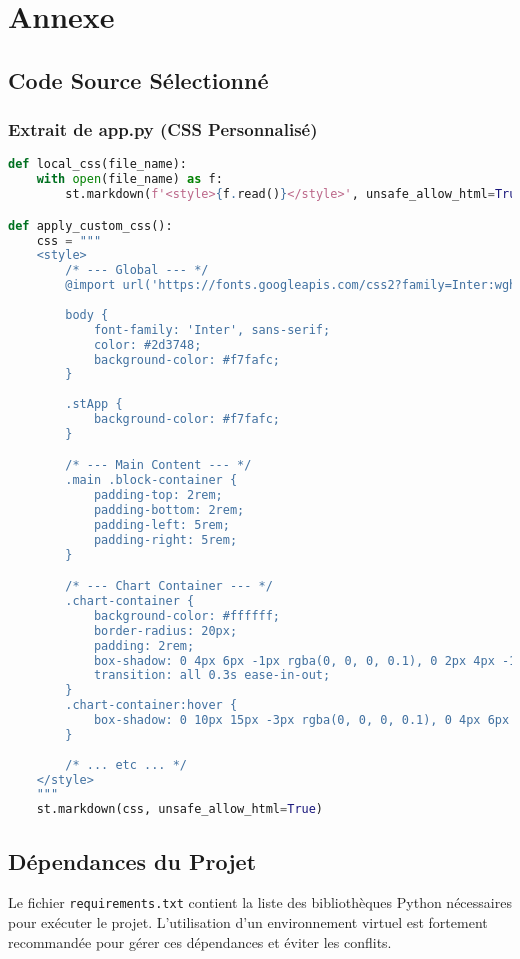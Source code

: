 \chapter{Annexe}
\minitoc

\section{Code Source Sélectionné}

\subsection{Extrait de app.py (CSS Personnalisé)}
\begin{lstlisting}[language=Python, caption={CSS pour le style du tableau de bord}]
def local_css(file_name):
    with open(file_name) as f:
        st.markdown(f'<style>{f.read()}</style>', unsafe_allow_html=True)

def apply_custom_css():
    css = """
    <style>
        /* --- Global --- */
        @import url('https://fonts.googleapis.com/css2?family=Inter:wght@400;600;700&display=swap');
        
        body {
            font-family: 'Inter', sans-serif;
            color: #2d3748;
            background-color: #f7fafc;
        }
        
        .stApp {
            background-color: #f7fafc;
        }

        /* --- Main Content --- */
        .main .block-container {
            padding-top: 2rem;
            padding-bottom: 2rem;
            padding-left: 5rem;
            padding-right: 5rem;
        }

        /* --- Chart Container --- */
        .chart-container {
            background-color: #ffffff;
            border-radius: 20px;
            padding: 2rem;
            box-shadow: 0 4px 6px -1px rgba(0, 0, 0, 0.1), 0 2px 4px -1px rgba(0, 0, 0, 0.06);
            transition: all 0.3s ease-in-out;
        }
        .chart-container:hover {
            box-shadow: 0 10px 15px -3px rgba(0, 0, 0, 0.1), 0 4px 6px -2px rgba(0, 0, 0, 0.05);
        }
        
        /* ... etc ... */
    </style>
    """
    st.markdown(css, unsafe_allow_html=True)
\end{lstlisting}

\section{Dépendances du Projet}
Le fichier \texttt{requirements.txt} contient la liste des bibliothèques Python nécessaires pour exécuter le projet. L'utilisation d'un environnement virtuel est fortement recommandée pour gérer ces dépendances et éviter les conflits.

